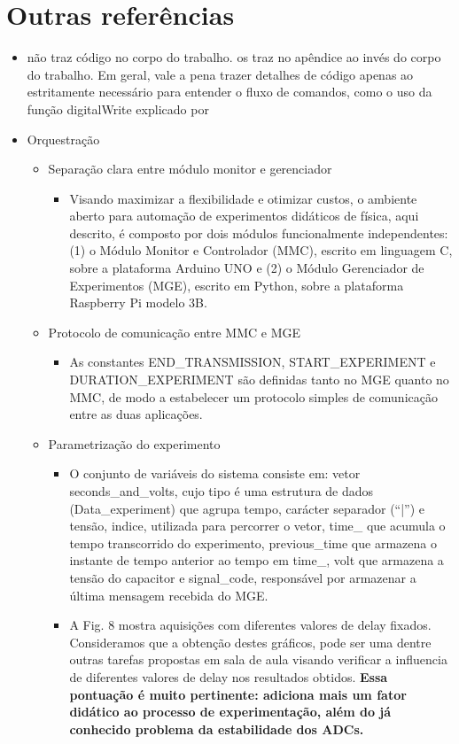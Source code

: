\documentclass{article}
\begin{document}
\section{Outras referências}
\begin{itemize}
	\item \cite{rogerio} não traz código no corpo do trabalho. \cite{iniciantes} os traz no apêndice ao invés do corpo do trabalho. Em geral, vale a pena trazer detalhes de código apenas ao estritamente necessário para entender o fluxo de comandos, como o uso da função digitalWrite explicado por \cite{iniciantes}
	\item{Orquestração}
	\begin{itemize}
		\item Separação clara entre módulo monitor e gerenciador
		\begin{itemize}
			\item Visando maximizar a flexibilidade e otimizar custos, o ambiente aberto para automação de experimentos didáticos de física, aqui descrito, é composto por dois módulos funcionalmente independentes: (1) o Módulo Monitor e Controlador (MMC), escrito em linguagem C, sobre a plataforma Arduino UNO e (2) o Módulo Gerenciador de Experimentos (MGE), escrito em Python, sobre a plataforma Raspberry Pi modelo 3B. \cite{rogerio}
		\end{itemize}
		\item{Protocolo de comunicação entre MMC e MGE}
		\begin{itemize}
			\item As constantes END\_TRANSMISSION, START\_EXPERIMENT e DURATION\_EXPERIMENT são definidas tanto no MGE quanto no MMC, de modo a estabelecer um protocolo simples de comunicação entre as duas aplicações. \cite{rogerio}
		\end{itemize}
		\item{Parametrização do experimento}
		\begin{itemize}
			\item O conjunto de variáveis do sistema consiste em: vetor seconds\_and\_volts, cujo tipo é uma estrutura de dados (Data\_experiment) que agrupa tempo, carácter separador (``|'') e tensão, indice, utilizada para percorrer o vetor, time\_ que acumula o tempo transcorrido do experimento, previous\_time que armazena o instante de tempo anterior ao tempo em time\_, volt que armazena a tensão do capacitor e signal\_code, responsável por armazenar a última mensagem recebida do MGE. \cite{rogerio}
			\item A Fig. 8 mostra aquisições com diferentes valores de delay fixados. Consideramos que a obtenção destes gráficos, pode ser uma dentre outras tarefas propostas em sala de aula visando verificar a influencia de diferentes valores de delay nos resultados obtidos. \cite{iniciantes} \textbf{Essa pontuação é muito pertinente: adiciona mais um fator didático ao processo de experimentação, além do já conhecido problema da estabilidade dos ADCs.}

\end{itemize}
\end{itemize}
\end{itemize}
\end{document}

